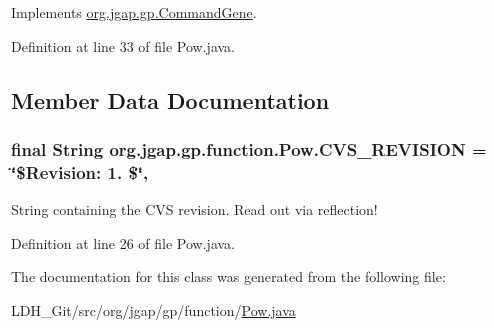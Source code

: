Implements \hyperlink{classorg_1_1jgap_1_1gp_1_1_command_gene_a236141d99059da808afe7a9217e411c7}{org.\-jgap.\-gp.\-Command\-Gene}.



Definition at line 33 of file Pow.\-java.



\subsection{Member Data Documentation}
\hypertarget{classorg_1_1jgap_1_1gp_1_1function_1_1_pow_a3f35084162c1b0c190fb754c235bb661}{
\subsubsection[{C\-V\-S\-\_\-\-R\-E\-V\-I\-S\-I\-O\-N}]{\setlength{\rightskip}{0pt plus 5cm}final String org.\-jgap.\-gp.\-function.\-Pow.\-C\-V\-S\-\_\-\-R\-E\-V\-I\-S\-I\-O\-N = \char`\"{}\$Revision\-: 1. \$\char`\"{}\hspace{0.3cm}{\ttfamily [static]}, {\ttfamily [private]}}}\label{classorg_1_1jgap_1_1gp_1_1function_1_1_pow_a3f35084162c1b0c190fb754c235bb661}
String containing the C\-V\-S revision. Read out via reflection! 

Definition at line 26 of file Pow.\-java.



The documentation for this class was generated from the following file\-:\begin{DoxyCompactItemize}
\item 
L\-D\-H\-\_\-\-Git/src/org/jgap/gp/function/\hyperlink{_pow_8java}{Pow.\-java}\end{DoxyCompactItemize}
